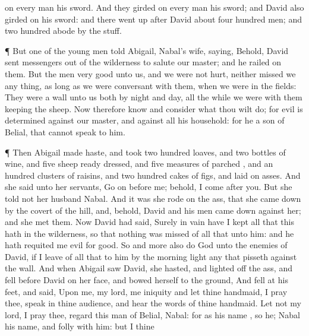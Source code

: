 {on every
man his
sword. And they girded
on every
man his
sword; and
David also girded
on his
sword: and there went
up
after
David about
four
hundred
men; and two
hundred
abode by the
stuff.
\par }{\PP {}¶ But
one of the young
men
told
Abigail,
Nabal’s
wife,
saying, Behold,
David
sent
messengers out of the
wilderness to
salute our
master; and he
railed on them.
But the
men
{}
very
good unto us, and we were not
hurt, neither
missed we any
thing, as long
as we were
conversant with them, when we were in the
fields:
They were a
wall unto us both by
night and
day, all the
while we were with them
keeping the
sheep.
Now therefore
know and
consider what thou wilt
do; for
evil is
determined against our
master, and against all his
household: for he
{} a
son of
Belial, that
{} cannot
speak to him.
\par }{\PP {}¶ Then
Abigail made
haste, and
took two
hundred
loaves, and
two
bottles of
wine, and
five
sheep ready
dressed, and
five
measures of
parched
{}, and an
hundred clusters of
raisins, and two
hundred
cakes of figs, and
laid
{} on
asses.
And she
said unto her
servants, Go
on
before me; behold, I
come
after you. But she
told not her
husband
Nabal.
And it was
{} she
rode on the
ass, that she came
down by the
covert of the
hill, and, behold,
David and his
men came
down
against her; and she
met them.
Now
David had
said, Surely in
vain have I
kept all that
this
{} hath in the
wilderness, so that
nothing was
missed of all that
{} unto him: and he hath
requited me
evil for
good.
So and
more also
do
God unto the
enemies of
David, if I
leave of all that
{} to him
by the
morning
light any that
pisseth against the
wall.
And when
Abigail
saw
David, she
hasted, and lighted
off the
ass, and
fell
before
David on her
face, and
bowed herself to the
ground,
And
fell at his
feet, and
said, Upon me, my
lord,
{} me
{}
iniquity
{} and let thine
handmaid, I pray thee,
speak in thine
audience, and
hear the
words of thine
handmaid.
Let not my
lord, I pray thee,
regard this
man of
Belial,
{}
Nabal: for as his
name
{}, so
{} he;
Nabal
{} his
name, and
folly
{} with him: but I thine
}

